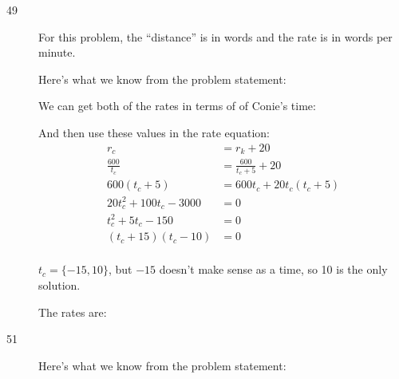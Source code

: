 \documentclass[fleqn,addpoints]{exam}
\begin{document}
\begin{description}

\item[49]

For this problem, the ``distance'' is in words and the rate is in words per minute.

Here's what we know from the problem statement:


We can get both of the rates in terms of of Conie's time:

And then use these values in the rate equation:
\begin{align*}
  r_c &= r_k + 20 \\
  \frac{600}{t_c} &= \frac{600}{t_c + 5} + 20 \\
  600(t_c+5) &= 600t_c + 20t_c(t_c+5) \\
  20t_c^2+100t_c - 3000 &= 0\\
  t_c^2+5t_c - 150 &= 0\\
  (t_c+15)(t_c-10) &= 0\\
\end{align*}

$t_c = \{-15, 10\}$, but $-15$ doesn't make sense as a time, so 10 is the only solution.

The rates are:

\item[51]

Here's what we know from the problem statement:


\end{description}
\end{document}
